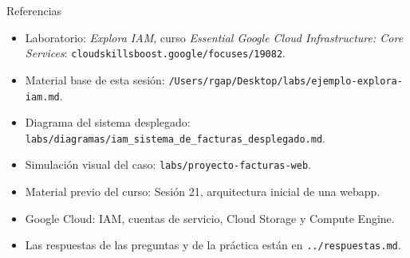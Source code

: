 \documentclass[aspectratio=169,10pt,c]{beamer}
\begin{document}
\begin{frame}{Referencias}
\scriptsize
\begin{itemize}\setlength\itemsep{4pt}
  \item Laboratorio: \textit{Explora IAM}, curso \textit{Essential Google Cloud Infrastructure: Core Services}: \texttt{cloudskillsboost.google/focuses/19082}.
  \item Material base de esta sesión: \texttt{/Users/rgap/Desktop/labs/ejemplo-explora-iam.md}.
  \item Diagrama del sistema desplegado: \texttt{labs/diagramas/iam\_sistema\_de\_facturas\_desplegado.md}.
  \item Simulación visual del caso: \texttt{labs/proyecto-facturas-web}.
  \item Material previo del curso: Sesión 21, arquitectura inicial de una webapp.
  \item Google Cloud: IAM, cuentas de servicio, Cloud Storage y Compute Engine.
  \item Las respuestas de las preguntas y de la práctica están en \texttt{../respuestas.md}.
\end{itemize}
\end{frame}
\end{document}
